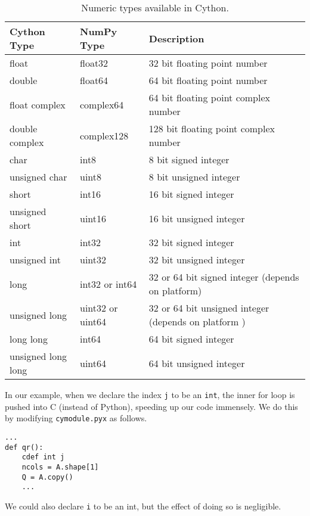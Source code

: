\begin{table}
\begin{center}
\begin{tabular}{|p{2.8cm}|p{2.5cm}|p{6cm}|}
\hline
Cython Type & NumPy Type& Description \\
\hline
float & float32 & 32 bit floating point number \\
double & float64 & 64 bit floating point number \\
float complex & complex64 & 64 bit floating point complex number \\
double complex & complex128 & 128 bit floating point complex number \\
char & int8 & 8 bit signed integer \\
unsigned char & uint8 & 8 bit unsigned integer \\
short & int16 & 16 bit signed integer \\
unsigned short & uint16 & 16 bit unsigned integer \\
int & int32 & 32 bit signed integer \\
unsigned int & uint32 & 32 bit unsigned integer \\
long & int32 or int64 & 32 or 64 bit signed integer (depends on platform) \\
unsigned long & uint32 or uint64 & 32 or 64 bit unsigned integer (depends on platform ) \\
long long & int64 & 64 bit signed integer \\
unsigned long long & uint64 & 64 bit unsigned integer \\
\hline
\end{tabular}
\end{center}
\caption{Numeric types available in Cython.}
\label{table:cython_types}
\end{table}

In our example, when we declare the index \texttt{j} to be an \texttt{int}, the inner for loop is pushed into C (instead of Python), speeding up our code immensely.
We do this by modifying \texttt{cymodule.pyx} as follows.
\begin{lstlisting}
...
def qr():
    cdef int j
    ncols = A.shape[1]
    Q = A.copy()
    ...
\end{lstlisting}

We could also declare \texttt{i} to be an int, but the effect of doing so is negligible.

